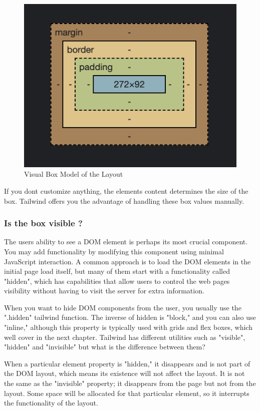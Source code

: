 \documentclass[conference]{IEEEtran}
\begin{document}
\begin{figure}
    \centering
    \includegraphics[width=0.9\linewidth]{Box_model.png}
    \caption{Visual Box Model of the Layout}
    \label{fig:enter-label}
\end{figure}

If you don\textquotesingle t customize anything, the element\textquotesingle s content determines the size of the box. Tailwind offers you the advantage of handling these box values manually.
\subsubsection{\textbf{Is the box visible ?}}

The user\textquotesingle s ability to see a DOM element is perhaps its
most crucial component. You may add functionality by modifying this component using minimal JavaScript interaction. A common approach is to load the DOM elements in the initial page load itself, but many of them start with a functionality called "hidden", which has capabilities that allow users to control the web page\textquotesingle s visibility without having to visit the server for extra information.

When you want to hide DOM components from the user, you usually use the ".hidden" tailwind function. The inverse of hidden is "block," and you can also use "inline," although this property is typically used with grids and flex boxes, which we\textquotesingle ll cover in the next chapter. Tailwind has different utilities such as "visible", "hidden" and "invisible" but what is the difference between them?

When a particular element property is "hidden," it disappears and is not part of the DOM layout, which means its existence will not affect the layout. It is not the same as the "invisible" property; it disappears from the page but not from the layout. Some space will be allocated for that particular element, so it interrupts the functionality of the layout.
\end{document}
